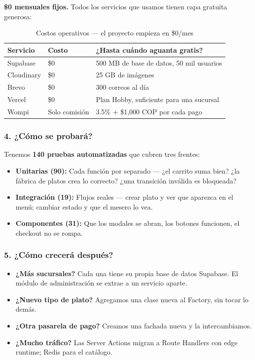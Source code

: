 \documentclass[12pt,a4paper]{article}
\begin{document}
\textbf{\$0 mensuales fijos.} Todos los servicios que usamos tienen capa gratuita generosa:

\begin{table}[H]
\centering
{}
\begin{tabular}{p{3cm} p{4cm} p{5.5cm}}
\toprule
\rowcolor{thomas!20}\textbf{Servicio} & \textbf{Costo} & \textbf{¿Hasta cuándo aguanta gratis?} \\
\midrule
Supabase & \$0 & 500 MB de base de datos, 50 mil usuarios \\
Cloudinary & \$0 & 25 GB de imágenes \\
Brevo & \$0 & 300 correos al día \\
Vercel & \$0 & Plan Hobby, suficiente para una sucursal \\
Wompi & Solo comisión & 3.5\% + \$1,000 COP por cada pago \\
\bottomrule
\end{tabular}
\caption{Costos operativos — el proyecto empieza en \$0/mes}
\end{table}

\subsubsection{4. ¿Cómo se probará?}

Tenemos \textbf{140 pruebas automatizadas} que cubren tres frentes:
\begin{itemize}[itemsep=2pt]
  \item \textbf{Unitarias (90):} Cada función por separado — ¿el carrito suma bien? ¿la fábrica de platos crea lo correcto? ¿una transición inválida es bloqueada?
  \item \textbf{Integración (19):} Flujos reales — crear plato y ver que aparezca en el menú; cambiar estado y que el mesero lo vea.
  \item \textbf{Componentes (31):} Que los modales se abran, los botones funcionen, el checkout no se rompa.
\end{itemize}

\subsubsection{5. ¿Cómo crecerá después?}

\begin{itemize}[itemsep=2pt]
  \item \textbf{¿Más sucursales?} Cada una tiene su propia base de datos Supabase. El módulo de administración se extrae a un servicio aparte.
  \item \textbf{¿Nuevo tipo de plato?} Agregamos una clase nueva al Factory, sin tocar lo demás.
  \item \textbf{¿Otra pasarela de pago?} Creamos una fachada nueva y la intercambiamos.
  \item \textbf{¿Mucho tráfico?} Las Server Actions migran a Route Handlers con edge runtime; Redis para el catálogo.
\end{itemize}
\end{document}
